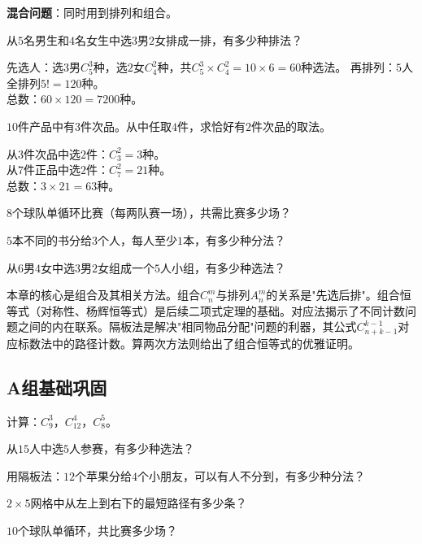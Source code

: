 \textbf{混合问题}：同时用到排列和组合。

\begin{example}
从$5$名男生和$4$名女生中选$3$男$2$女排成一排，有多少种排法？
\end{example}
\begin{solution}
先选人：选$3$男$C_5^3$种，选$2$女$C_4^2$种，共$C_5^3\times C_4^2 = 10\times6 = 60$种选法。
再排列：$5$人全排列$5! = 120$种。\\
总数：$60\times120 = 7200$种。
\end{solution}

\begin{example}
$10$件产品中有$3$件次品。从中任取$4$件，求恰好有$2$件次品的取法。
\end{example}
\begin{solution}
从$3$件次品中选$2$件：$C_3^2=3$种。\\
从$7$件正品中选$2$件：$C_7^2=21$种。\\
总数：$3\times21 = 63$种。
\end{solution}

\begin{exercise}
\item $8$个球队单循环比赛（每两队赛一场），共需比赛多少场？
\item $5$本不同的书分给$3$个人，每人至少$1$本，有多少种分法？
\item 从$6$男$4$女中选$3$男$2$女组成一个$5$人小组，有多少种选法？
\end{exercise}


本章的核心是组合及其相关方法。组合$C_n^m$与排列$A_n^m$的关系是"先选后排"。组合恒等式（对称性、杨辉恒等式）是后续二项式定理的基础。对应法揭示了不同计数问题之间的内在联系。隔板法是解决"相同物品分配"问题的利器，其公式$C_{n+k-1}^{k-1}$对应标数法中的路径计数。算两次方法则给出了组合恒等式的优雅证明。


\subsection*{A组\quad 基础巩固}

\begin{exercise}
\item 计算：$C_9^3$，$C_{12}^4$，$C_8^5$。
\item 从$15$人中选$5$人参赛，有多少种选法？
\item 用隔板法：$12$个苹果分给$4$个小朋友，可以有人不分到，有多少种分法？
\item $2\times5$网格中从左上到右下的最短路径有多少条？
\item $10$个球队单循环，共比赛多少场？
\end{exercise}

